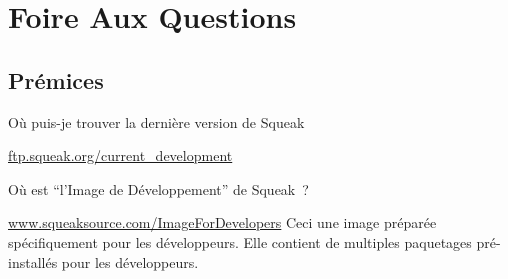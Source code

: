 \documentclass[a4paper,10pt,twoside]{book}
\begin{document}
	\renewcommand{\nnbb}[2]{} %
	\sloppy
\fi
  
\chapter{Foire Aux Questions}
\label{cha:faq}


\section{Pr\'emices}
\begin{faq}
O\`u puis-je trouver la derni\`ere version de Squeak
\end{faq}
\answer
\url{ftp.squeak.org/current_development}

\begin{faq}
O\`u est ``l'Image de D\'eveloppement'' de Squeak~?
\end{faq}
\answer
\url{www.squeaksource.com/ImageForDevelopers}
Ceci une image pr\'epar\'ee sp\'ecifiquement pour les d\'eveloppeurs. Elle contient de multiples 
paquetages pr\'e-install\'es pour les d\'eveloppeurs.
\end{document}

